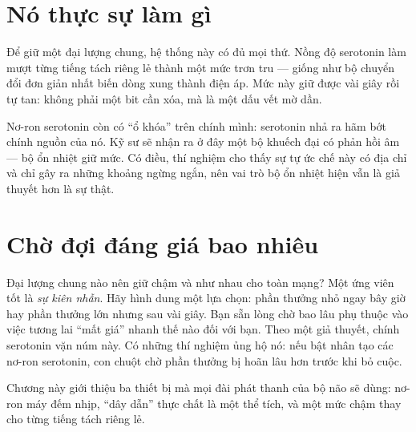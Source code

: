 
\section*{Nó thực sự làm gì}

Để giữ một đại lượng chung, hệ thống này có đủ mọi thứ. Nồng độ serotonin làm mượt từng tiếng tách riêng lẻ thành một mức trơn tru --- giống như bộ chuyển đổi đơn giản nhất biến dòng xung thành điện áp. Mức này giữ được vài giây rồi tự tan: không phải một bit cần xóa, mà là một dấu vết mờ dần.

Nơ-ron serotonin còn có ``ổ khóa'' trên chính mình: serotonin nhả ra hãm bớt chính nguồn của nó. Kỹ sư sẽ nhận ra ở đây một bộ khuếch đại có phản hồi âm --- bộ ổn nhiệt giữ mức. Có điều, thí nghiệm cho thấy sự tự ức chế này có địa chỉ và chỉ gây ra những khoảng ngừng ngắn, nên vai trò bộ ổn nhiệt hiện vẫn là giả thuyết hơn là sự thật.

\section*{Chờ đợi đáng giá bao nhiêu}

Đại lượng chung nào nên giữ chậm và như nhau cho toàn mạng? Một ứng viên tốt là \emph{sự kiên nhẫn}. Hãy hình dung một lựa chọn: phần thưởng nhỏ ngay bây giờ hay phần thưởng lớn nhưng sau vài giây. Bạn sẵn lòng chờ bao lâu phụ thuộc vào việc tương lai ``mất giá'' nhanh thế nào đối với bạn. Theo một giả thuyết, chính serotonin vặn núm này. Có những thí nghiệm ủng hộ nó: nếu bật nhân tạo các nơ-ron serotonin, con chuột chờ phần thưởng bị hoãn lâu hơn trước khi bỏ cuộc.

Chương này giới thiệu ba thiết bị mà mọi đài phát thanh của bộ não sẽ dùng: nơ-ron máy đếm nhịp, ``dây dẫn'' thực chất là một thể tích, và một mức chậm thay cho từng tiếng tách riêng lẻ.

